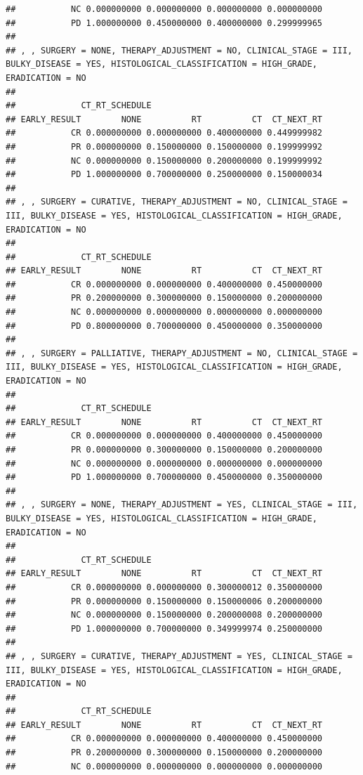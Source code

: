 \documentclass[]{article}
\begin{document}
\begin{verbatim}
##           NC 0.000000000 0.000000000 0.000000000 0.000000000
##           PD 1.000000000 0.450000000 0.400000000 0.299999965
## 
## , , SURGERY = NONE, THERAPY_ADJUSTMENT = NO, CLINICAL_STAGE = III, BULKY_DISEASE = YES, HISTOLOGICAL_CLASSIFICATION = HIGH_GRADE, ERADICATION = NO
## 
##             CT_RT_SCHEDULE
## EARLY_RESULT        NONE          RT          CT  CT_NEXT_RT
##           CR 0.000000000 0.000000000 0.400000000 0.449999982
##           PR 0.000000000 0.150000000 0.150000000 0.199999992
##           NC 0.000000000 0.150000000 0.200000000 0.199999992
##           PD 1.000000000 0.700000000 0.250000000 0.150000034
## 
## , , SURGERY = CURATIVE, THERAPY_ADJUSTMENT = NO, CLINICAL_STAGE = III, BULKY_DISEASE = YES, HISTOLOGICAL_CLASSIFICATION = HIGH_GRADE, ERADICATION = NO
## 
##             CT_RT_SCHEDULE
## EARLY_RESULT        NONE          RT          CT  CT_NEXT_RT
##           CR 0.000000000 0.000000000 0.400000000 0.450000000
##           PR 0.200000000 0.300000000 0.150000000 0.200000000
##           NC 0.000000000 0.000000000 0.000000000 0.000000000
##           PD 0.800000000 0.700000000 0.450000000 0.350000000
## 
## , , SURGERY = PALLIATIVE, THERAPY_ADJUSTMENT = NO, CLINICAL_STAGE = III, BULKY_DISEASE = YES, HISTOLOGICAL_CLASSIFICATION = HIGH_GRADE, ERADICATION = NO
## 
##             CT_RT_SCHEDULE
## EARLY_RESULT        NONE          RT          CT  CT_NEXT_RT
##           CR 0.000000000 0.000000000 0.400000000 0.450000000
##           PR 0.000000000 0.300000000 0.150000000 0.200000000
##           NC 0.000000000 0.000000000 0.000000000 0.000000000
##           PD 1.000000000 0.700000000 0.450000000 0.350000000
## 
## , , SURGERY = NONE, THERAPY_ADJUSTMENT = YES, CLINICAL_STAGE = III, BULKY_DISEASE = YES, HISTOLOGICAL_CLASSIFICATION = HIGH_GRADE, ERADICATION = NO
## 
##             CT_RT_SCHEDULE
## EARLY_RESULT        NONE          RT          CT  CT_NEXT_RT
##           CR 0.000000000 0.000000000 0.300000012 0.350000000
##           PR 0.000000000 0.150000000 0.150000006 0.200000000
##           NC 0.000000000 0.150000000 0.200000008 0.200000000
##           PD 1.000000000 0.700000000 0.349999974 0.250000000
## 
## , , SURGERY = CURATIVE, THERAPY_ADJUSTMENT = YES, CLINICAL_STAGE = III, BULKY_DISEASE = YES, HISTOLOGICAL_CLASSIFICATION = HIGH_GRADE, ERADICATION = NO
## 
##             CT_RT_SCHEDULE
## EARLY_RESULT        NONE          RT          CT  CT_NEXT_RT
##           CR 0.000000000 0.000000000 0.400000000 0.450000000
##           PR 0.200000000 0.300000000 0.150000000 0.200000000
##           NC 0.000000000 0.000000000 0.000000000 0.000000000

\end{verbatim}
\end{document}
